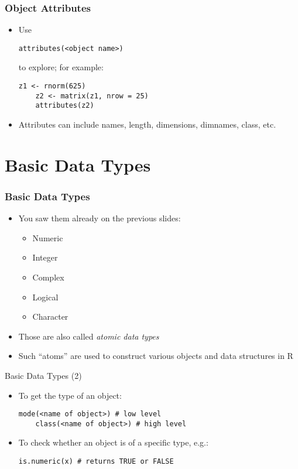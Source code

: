 \documentclass[10pt]{beamer}
\theoremstyle{definition}
\begin{document}
\begin{frame}[fragile]
\frametitle{Object Attributes}
\begin{itemize}
	\item Use
	\begin{lstlisting}[style = rstyle, breaklines]
	attributes(<object name>)
	\end{lstlisting}
	to explore; for example:
	
	\begin{lstlisting}[style = rstyle, breaklines]
	z1 <- rnorm(625)
	z2 <- matrix(z1, nrow = 25)
	attributes(z2)
	\end{lstlisting}

	\item Attributes can include names, length, dimensions, dimnames, class, etc.
\end{itemize}

\end{frame}

\section{Basic Data Types}
\begin{frame}
\frametitle{Basic Data Types}
\begin{itemize}
	\item You saw them already on the previous slides:
	\begin{itemize}
		\item Numeric

		\item Integer

		\item Complex

		\item Logical
		
		\item Character
	\end{itemize}

	\item Those are also called \textit{atomic data types}
	
	\item Such ``atoms'' are used to construct various objects and data structures in R
\end{itemize}
\end{frame}

\begin{frame}[fragile]{Basic Data Types (2)}
\begin{itemize}
	\item To get the type of an object:
	\begin{lstlisting}[style = rstyle, breaklines]
	mode(<name of object>) # low level
	class(<name of object>) # high level
	\end{lstlisting}

	\item To check whether an object is of a specific type, e.g.:
	\begin{lstlisting}[style = rstyle, breaklines]
	is.numeric(x) # returns TRUE or FALSE
	\end{lstlisting}
\end{itemize}
\end{frame}
\end{document}
